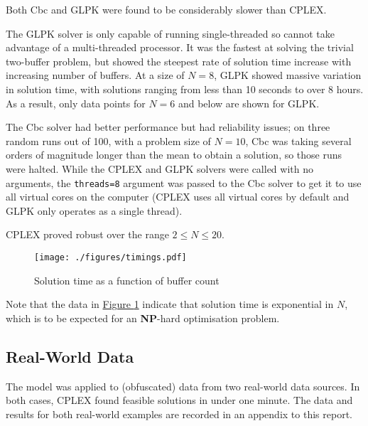 Both Cbc and GLPK were found to be considerably slower than CPLEX.

The GLPK solver is only capable of running single-threaded so cannot take
advantage of a multi-threaded processor.
It was the fastest at solving the trivial two-buffer problem, but showed the
steepest rate of solution time increase with increasing number of buffers.
At a size of $N=8$, GLPK showed massive variation in solution time, with
solutions ranging from less than 10 seconds to over 8 hours.  As a result,
only data points for $N=6$ and below are shown for GLPK.

The Cbc solver had better performance but had reliability issues; on three
random runs out of 100, with a problem size of $N=10$, Cbc was taking several
orders of magnitude longer than the mean to obtain a solution, so those runs
were halted.
While the CPLEX and GLPK solvers were called with no arguments, the
\texttt{threads=8} argument was passed to the Cbc solver to get it to use all
virtual cores on the computer (CPLEX uses all virtual cores by default and GLPK
only operates as a single thread).

CPLEX proved robust over the range $2 \le N \le 20$.

\begin{figure}
    \label{fig.timings}
    \centering
    \texttt{[image: ./figures/timings.pdf]}
    \caption{Solution time as a function of buffer count}
\end{figure}

Note that the data in \hyperref[fig.timings]{Figure \ref*{fig.timings}}
indicate that solution time is exponential in $N$, which is to be expected for
an \textbf{NP}-hard optimisation problem.

\subsection{Real-World Data}\label{SS.realworld}
The model was applied to (obfuscated) data from two real-world data sources.
In both cases, CPLEX found feasible solutions in under one minute.
The data and results for both real-world examples are recorded in an appendix
to this report.

